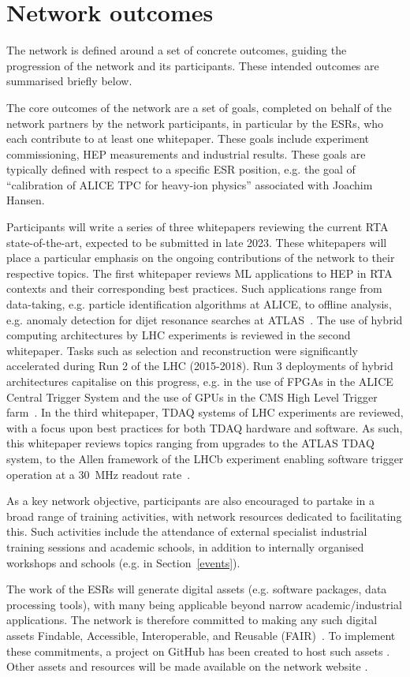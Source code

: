 \section{Network outcomes}
\label{outcomes}
The network is defined around a set of concrete outcomes, guiding the progression of the network and its participants. These intended outcomes are summarised briefly below.

The core outcomes of the network are a set of goals, completed on behalf of the network partners by the network participants, in particular by the ESRs, who each contribute to at least one whitepaper.  These goals include experiment commissioning, HEP measurements and industrial results. These goals are typically defined with respect to a specific ESR position, e.g. the goal of ``calibration of ALICE TPC for heavy-ion physics'' associated with Joachim Hansen.

Participants will write a series of three whitepapers reviewing the current RTA state-of-the-art, expected to be submitted in late 2023. These whitepapers will place a particular emphasis on the ongoing contributions of the network to their respective topics. The first whitepaper reviews ML applications to HEP in RTA contexts and their corresponding best practices. Such applications range from data-taking, e.g. particle identification algorithms at ALICE, to offline analysis, e.g. anomaly detection for dijet resonance searches at ATLAS~\cite{ALICE-PID, ATLAS-dijet}. The use of hybrid computing architectures by LHC experiments is reviewed in the second whitepaper. Tasks such as selection and reconstruction were significantly accelerated during Run 2 of the LHC (2015-2018). Run 3 deployments of hybrid architectures capitalise on this progress, e.g. in the use of FPGAs in the ALICE Central Trigger System and the use of GPUs in the CMS High Level Trigger farm~\cite{ALICE-CTS, CMS-HLT-farm}. In the third whitepaper, TDAQ systems of LHC experiments are reviewed, with a focus upon best practices for both TDAQ hardware and software. As such, this whitepaper reviews topics ranging from upgrades to the ATLAS TDAQ system, to the Allen framework of the LHCb experiment enabling software trigger operation at a 30~MHz readout rate~\cite{ATLAS-TDAQ, LHCb-Allen}.

As a key network objective, participants are also encouraged to partake in a broad range of training activities, with network resources dedicated to facilitating this. Such activities include the attendance of external specialist industrial training sessions and academic schools, in addition to internally organised workshops and schools (e.g. in Section~\ref{events}).

The work of the ESRs will generate digital assets (e.g. software packages, data processing tools), with many being applicable beyond narrow academic/industrial applications. The network is therefore committed to making any such digital assets Findable, Accessible, Interoperable, and Reusable (FAIR)~\cite{FAIR-principles}. To implement these commitments, a project on GitHub has been created to host such assets \cite{SMARTHEP-github}. Other assets and resources will be made available on the network website \cite{SMARTHEP-website}.